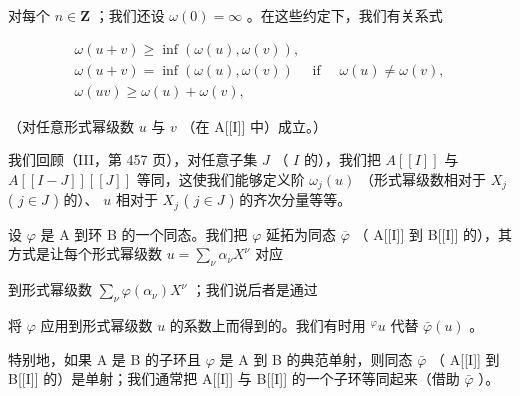 对每个 \(n \in \mathbf{Z}\) ；我们还设 \(\omega(0) = \infty\) 。在这些约定下，我们有关系式

\[
\begin{array}{c} \omega (u + v) \geqslant \inf (\omega (u), \omega (v)), \\ \omega (u + v) = \inf (\omega (u), \omega (v)) \quad \text { if } \quad \omega (u) \neq \omega (v), \\ \omega (u v) \geqslant \omega (u) + \omega (v), \end{array}
\]

（对任意形式幂级数 \(u\) 与 \(v\) （在 A{[}{[}I{]}{]} 中）成立。）

我们回顾（III，第 457 页），对任意子集 \(J\) （ \(I\) 的），我们把 \(A[[I]]\) 与 \(A[[I - J]][[J]]\) 等同，这使我们能够定义阶 \(\omega_{j}(u)\) （形式幂级数相对于 \(X_{j}\) ( \(j \in J\) ) 的）、 \(u\) 相对于 \(X_{j}\) ( \(j \in J\) ) 的齐次分量等等。

设 \(\varphi\) 是 A 到环 B 的一个同态。我们把 \(\varphi\) 延拓为同态 \(\overline{\varphi}\) （ A{[}{[}I{]}{]} 到 B{[}{[}I{]}{]} 的），其方式是让每个形式幂级数 \(u = \sum_{\nu} \alpha_{\nu} X^{\nu}\) 对应

到形式幂级数 \(\sum_{\nu} \varphi(\alpha_{\nu}) X^{\nu}\) ；我们说后者是通过

将 \(\varphi\) 应用到形式幂级数 \(u\) 的系数上而得到的。我们有时用 \({}^{\varphi}u\) 代替 \(\bar{\varphi}(u)\) 。

特别地，如果 A 是 B 的子环且 \(\varphi\) 是 A 到 B 的典范单射，则同态 \(\bar{\varphi}\) （ A{[}{[}I{]}{]} 到 B{[}{[}I{]}{]} 的）是单射；我们通常把 A{[}{[}I{]}{]} 与 B{[}{[}I{]}{]} 的一个子环等同起来（借助 \(\bar{\varphi}\) ）。

